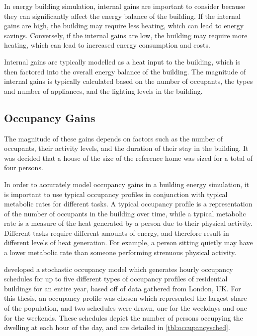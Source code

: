 In energy building simulation, internal gains are important to consider because they can significantly affect the energy balance of the building. If the internal gains are high, the building may require less heating, which can lead to energy savings. Conversely, if the internal gains are low, the building may require more heating, which can lead to increased energy consumption and costs. \cite{buttitta_high-temporal_2020}

Internal gains are typically modelled as a heat input to the building, which is then factored into the overall energy balance of the building. The magnitude of internal gains is typically calculated based on the number of occupants, the types and number of appliances, and the lighting levels in the building.

\subsection{Occupancy Gains}
The magnitude of these gains depends on factors such as the number of occupants, their activity levels, and the duration of their stay in the building. It was decided that a house of the size of the reference home was sized for a total of four persons. 

In order to accurately model occupancy gains in a building energy simulation, it is important to use typical occupancy profiles in conjunction with typical metabolic rates for different tasks. A typical occupancy profile is a representation of the number of occupants in the building over time, while a typical metabolic rate is a measure of the heat generated by a person due to their physical activity. Different tasks require different amounts of energy, and therefore result in different levels of heat generation. For example, a person sitting quietly may have a lower metabolic rate than someone performing strenuous physical activity.

\citeauthor{buttitta_high-temporal_2020} \cite{buttitta_high-temporal_2020} developed a stochastic occupancy model which generates hourly occupancy schedules for up to five different types of occupancy profiles of residential buildings for an entire year, based off of data gathered from London, UK. For this thesis, an occupancy profile was chosen which represented the largest share of the population, and two schedules were drawn, one for the weekdays and one for the weekends. These schedules depict the number of persons occupying the dwelling at each hour of the day, and are detailed in \cref{tbl:occupancysched}.

